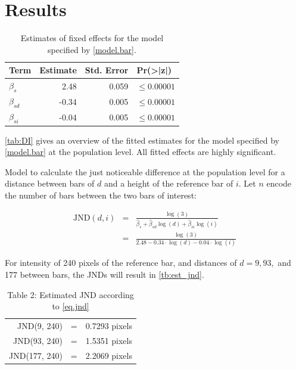 \section{Results}

\begin{table}
\caption{\label{tab:DI} Estimates of fixed effects for the model specified by \autoref{model.bar}.}
\centering

\begin{tabular}{lrrl}
\toprule
Term & Estimate & Std. Error & Pr(>|z|)\\
\midrule
$\beta_s$ & 2.48 & 0.059 & $\le 0.00001$\\
$\beta_{sd}$ & -0.34 & 0.005 & $\le 0.00001$\\
$\beta_{si}$ & -0.04 & 0.005 & $\le 0.00001$\\
\bottomrule
\end{tabular}
\end{table}

\autoref{tab:DI} gives an overview of the fitted estimates for the model specified by \autoref{model.bar} at the population level. All fitted effects are highly significant. 

Model to calculate the just noticeable difference at the population level for a distance between bars of $d$ and a height of the reference bar of $i$. Let $n$ encode the number of bars between the two bars of interest:

\begin{eqnarray}
\label{eq.jnd}
\text{JND}(d, i) &=& 
\frac{\log (3)}{\hat{\beta}_s + \hat{\beta}_{sd} \log(d) + \hat{\beta}_{si} \log(i)} \\ \nonumber
&=&\frac{\log (3)}{2.48 - 0.34 \cdot\log(d) - 0.04 \cdot\log(i)}
\end{eqnarray}




For intensity of 240 pixels of the reference bar, and  distances of $d = 9, 93,$ and 177 between bars, the JNDs will result in \autoref{tb:est_jnd}.

\begin{table}
\caption{\label{tb:est_jnd} Table 2: Estimated JND according to \autoref{eq.jnd}}
\centering
\begin{tabular}{rcr}\hline
JND(9, 240) &=& 0.7293 pixels \\
JND(93, 240) &=& 1.5351 pixels \\
JND(177, 240) &=& 2.2069 pixels\\ \hline
\end{tabular}
\end{table}



